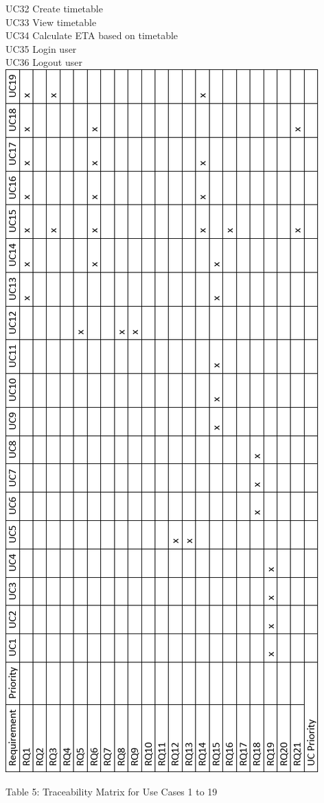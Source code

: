 \documentclass{article}
\begin{document}
{			UC32 Create timetable\\
			UC33 View timetable\\
			UC34 Calculate ETA based on timetable\\
			UC35 Login user\\
			UC36 Logout user\\
			\newpage
				\includegraphics[scale=0.60]{Traceability_Matrix_1}
			\begin{center}
    			Table 5: Traceability Matrix for Use Cases 1 to 19
			\end{center}
			
}
\end{document}
